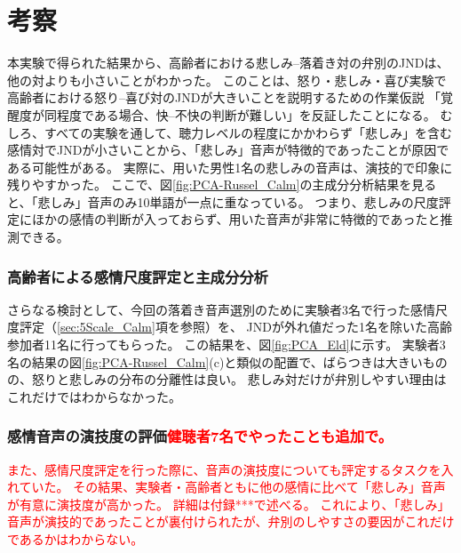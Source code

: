 \section{考察}
本実験で得られた結果から、高齢者における悲しみ--落着き対の弁別のJNDは、他の対よりも小さいことがわかった。
このことは、怒り・悲しみ・喜び実験で高齢者における怒り--喜び対のJNDが大きいことを説明するための作業仮説
「覚醒度が同程度である場合、快--不快の判断が難しい」を反証したことになる。
むしろ、すべての実験を通して、聴力レベルの程度にかかわらず「悲しみ」を含む感情対でJNDが小さいことから、「悲しみ」音声が特徴的であったことが原因である可能性がある。
実際に、用いた男性1名の悲しみの音声は、演技的で印象に残りやすかった。
ここで、図\ref{fig:PCA-Russel_Calm}の主成分分析結果を見ると、「悲しみ」音声のみ10単語が一点に重なっている。
つまり、悲しみの尺度評定にほかの感情の判断が入っておらず、用いた音声が非常に特徴的であったと推測できる。

\subsubsection{高齢者による感情尺度評定と主成分分析}
さらなる検討として、今回の落着き音声選別のために実験者3名で行った感情尺度評定（\ref{sec:5Scale_Calm}項を参照）を、
JNDが外れ値だった1名を除いた高齢参加者11名に行ってもらった。
この結果を、図\ref{fig:PCA_Eld}に示す。
実験者3名の結果の図\ref{fig:PCA-Russel_Calm}(c)と類似の配置で、ばらつきは大きいものの、怒りと悲しみの分布の分離性は良い。
悲しみ対だけが弁別しやすい理由はこれだけではわからなかった。

\subsubsection{感情音声の演技度の評価\textcolor{red}{健聴者7名でやったことも追加で。}}
\textcolor{red}{また、感情尺度評定を行った際に、音声の演技度についても評定するタスクを入れていた。
その結果、実験者・高齢者ともに他の感情に比べて「悲しみ」音声が有意に演技度が高かった。
詳細は付録***で述べる。
これにより、「悲しみ」音声が演技的であったことが裏付けられたが、弁別のしやすさの要因がこれだけであるかはわからない。}




